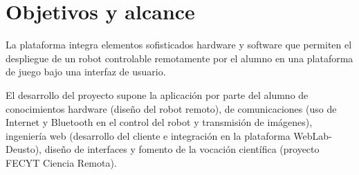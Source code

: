 \chapter{Objetivos y alcance}

La plataforma integra elementos sofisticados hardware y software que permiten el despliegue de un
robot controlable remotamente por el alumno en una plataforma de juego bajo una interfaz de usuario.

El desarrollo del proyecto supone la aplicación por parte del alumno de conocimientos hardware
(diseño del robot remoto), de comunicaciones (uso de Internet y Bluetooth en el control del robot y
transmisión de imágenes), ingeniería web (desarrollo del cliente e integración en la plataforma
WebLab-Deusto), diseño de interfaces y fomento de la vocación científica (proyecto FECYT Ciencia
Remota).


